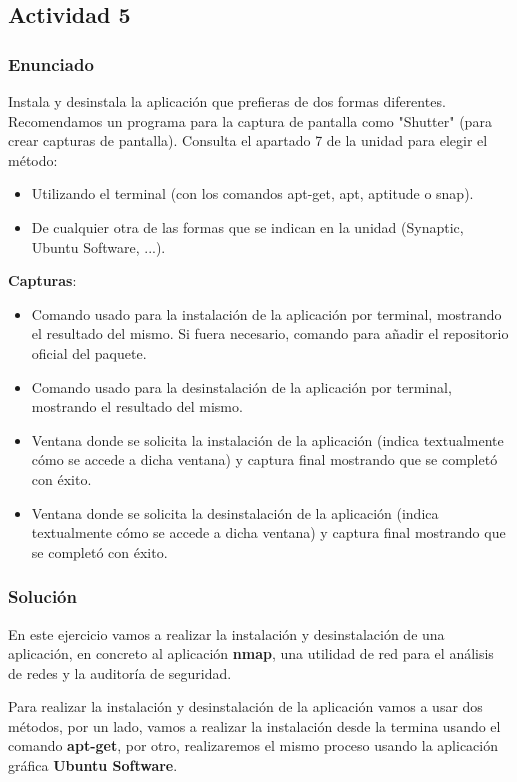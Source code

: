 \subsection{Actividad 5}

\subsubsection{Enunciado}
Instala y desinstala la aplicación que prefieras de dos formas diferentes. Recomendamos un programa para la captura de pantalla como "Shutter" (para crear capturas de pantalla). Consulta el apartado 7 de la unidad para elegir el método:

\begin{itemize}
    \item Utilizando el terminal (con los comandos apt-get, apt, aptitude o snap).
    \item De cualquier otra de las formas que se indican en la unidad (Synaptic,  Ubuntu Software, ...).
\end{itemize}

\textbf{Capturas}:
\begin{itemize}
    \item Comando usado para la instalación de la aplicación por terminal, mostrando el resultado del mismo. Si fuera necesario, comando para añadir el repositorio oficial del paquete.
    \item Comando usado para la desinstalación de la aplicación por terminal, mostrando el resultado del mismo.
    \item Ventana donde se solicita la instalación de la aplicación (indica textualmente cómo se accede a dicha ventana) y captura final mostrando que se completó con éxito.
    \item Ventana donde se solicita la desinstalación de la aplicación (indica textualmente cómo se accede a dicha ventana) y captura final mostrando que se completó con éxito.
\end{itemize}

\subsubsection{Solución}
En este ejercicio vamos a realizar la instalación y desinstalación de una aplicación, en concreto al aplicación \textbf{nmap}, una utilidad de red para el análisis de redes y la auditoría de seguridad.

Para realizar la instalación y desinstalación de la aplicación vamos a usar dos métodos, por un lado, vamos a realizar la instalación desde la termina usando el comando \textbf{apt-get}, por otro, realizaremos el mismo proceso usando la aplicación gráfica \textbf{Ubuntu Software}.


